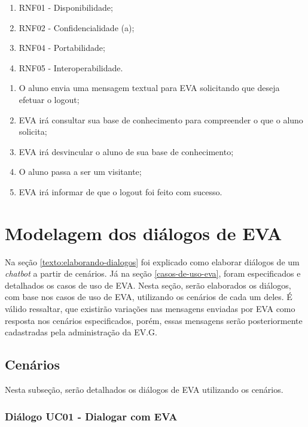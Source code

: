         \begin{enumerate}[label=\alph*)]
        \tightlist
            \item RNF01 - Disponibilidade;
            \item RNF02 - Confidencialidade (a);
            \item RNF04 - Portabilidade;
            \item RNF05 - Interoperabilidade.
        \end{enumerate}
        
    \begin{enumerate}[label=\alph*)]
        \tightlist
        \item O aluno envia uma mensagem textual para EVA solicitando que deseja efetuar o logout;
        \item EVA irá consultar sua base de conhecimento para compreender o que o aluno solicita;
        \item EVA irá desvincular o aluno de sua base de conhecimento;
        \item O aluno passa a ser um visitante;            \item EVA irá informar de que o logout foi feito com sucesso.
    \end{enumerate}


\section{Modelagem dos diálogos de EVA}

Na seção \ref{texto:elaborando-dialogos} foi explicado como elaborar diálogos de um \textit{chatbot} a partir de cenários. Já na seção \ref{casos-de-uso-eva}, foram especificados e detalhados os casos de uso de EVA. Nesta seção, serão elaborados os diálogos, com base nos casos de uso de EVA, utilizando os cenários de cada um deles. É válido ressaltar, que existirão variações nas mensagens enviadas por EVA como resposta nos cenários especificados, porém, essas mensagens serão posteriormente cadastradas pela administração da EV.G.

\subsection{Cenários}

Nesta subseção, serão detalhados os diálogos de EVA utilizando os cenários.

\subsubsection{Diálogo UC01 - Dialogar com EVA}


